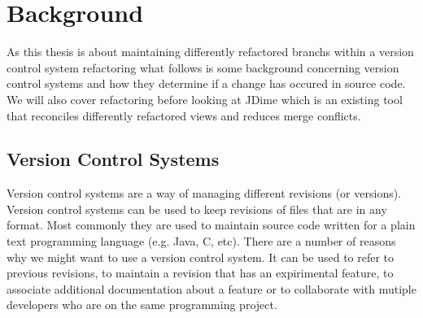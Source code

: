 \chapter{Background}

As this thesis is about maintaining differently refactored branchs within a version control system refactoring what follows is some background concerning version control systems and how they determine if a change has occured in source code.  We will also cover refactoring before looking at JDime which is an existing tool that reconciles differently refactored views and reduces merge conflicts. 


\section{Version Control Systems}
Version control systems are a way of managing different revisions (or versions). Version control systems can be used to keep revisions of files that are in any format. Most commonly they are used to maintain source code written for a plain text programming language (e.g. Java, C, etc).   There are a number of reasons why we might want to use a version control system. It can be used to refer to previous revisions, to maintain a revision that has an expirimental feature, to associate additional documentation about a feature or to collaborate with mutiple developers who are on the same programming project.


